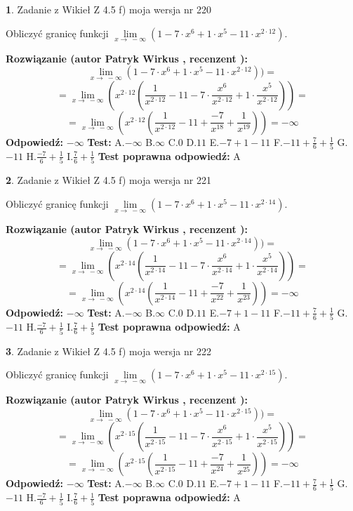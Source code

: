 \documentclass[12pt, a4paper]{article}
\theoremstyle{definition} %
\newtheorem{zad}{}
\newcommand{\zadStart}[1]{\begin{zad}#1\newline}
\newcommand{\zadStop}{\end{zad}}
\newcommand{\rozwStart}[2]{\noindent \textbf{Rozwiązanie (autor #1 , recenzent #2): }\newline}
\newcommand{\rozwStop}{\newline}
\newcommand{\odpStart}{\noindent \textbf{Odpowiedź:}\newline}
\newcommand{\odpStop}{\newline}
\newcommand{\testStart}{\noindent \textbf{Test:}\newline}
\newcommand{\testStop}{\newline}
\newcommand{\kluczStart}{\noindent \textbf{Test poprawna odpowiedź:}\newline}
\newcommand{\kluczStop}{\newline}
\begin{document}
\zadStart{Zadanie z Wikieł Z 4.5 f) moja wersja nr 220}



Obliczyć granicę funkcji  $\lim\limits_{x\to\ -\infty}(1 - 7 \cdot x^{6}+1 \cdot x^{5}- 11 \cdot x^{2\cdot12})$.
\zadStop
\rozwStart{Patryk Wirkus}{}
$$\lim\limits_{x\to\ -\infty}(1 - 7 \cdot x^{6}+1 \cdot x^{5}- 11 \cdot x^{2\cdot12}))=$$
$$=\lim\limits_{x\to\ -\infty}(x^{2\cdot12}(\frac{1}{x^{2\cdot12}}-11 -7 \cdot \frac{x^{6}}{x^{2\cdot12}}+1 \cdot \frac{x^{5}}{x^{2\cdot12}}))=$$
$$=\lim\limits_{x\to\ -\infty}(x^{2\cdot12}(\frac{1}{x^{2\cdot12}}-11 + \frac{-7}{x^{18}}+ \frac{1}{x^{19}}))=-\infty$$
\rozwStop
\odpStart
$-\infty$
\odpStop
\testStart
A.$-\infty$ B.$\infty$ C.$0$ D.$11$ E.$-7 + 1 - 11$
F.$-11+\frac{7}{6}+\frac{1}{5}$ G.$-11$
H.$\frac{-7}{6}+\frac{1}{5}$
I.$\frac{7}{6}+\frac{1}{5}$
\testStop
\kluczStart
A
\kluczStop



\zadStart{Zadanie z Wikieł Z 4.5 f) moja wersja nr 221}



Obliczyć granicę funkcji  $\lim\limits_{x\to\ -\infty}(1 - 7 \cdot x^{6}+1 \cdot x^{5}- 11 \cdot x^{2\cdot14})$.
\zadStop
\rozwStart{Patryk Wirkus}{}
$$\lim\limits_{x\to\ -\infty}(1 - 7 \cdot x^{6}+1 \cdot x^{5}- 11 \cdot x^{2\cdot14}))=$$
$$=\lim\limits_{x\to\ -\infty}(x^{2\cdot14}(\frac{1}{x^{2\cdot14}}-11 -7 \cdot \frac{x^{6}}{x^{2\cdot14}}+1 \cdot \frac{x^{5}}{x^{2\cdot14}}))=$$
$$=\lim\limits_{x\to\ -\infty}(x^{2\cdot14}(\frac{1}{x^{2\cdot14}}-11 + \frac{-7}{x^{22}}+ \frac{1}{x^{23}}))=-\infty$$
\rozwStop
\odpStart
$-\infty$
\odpStop
\testStart
A.$-\infty$ B.$\infty$ C.$0$ D.$11$ E.$-7 + 1 - 11$
F.$-11+\frac{7}{6}+\frac{1}{5}$ G.$-11$
H.$\frac{-7}{6}+\frac{1}{5}$
I.$\frac{7}{6}+\frac{1}{5}$
\testStop
\kluczStart
A
\kluczStop



\zadStart{Zadanie z Wikieł Z 4.5 f) moja wersja nr 222}



Obliczyć granicę funkcji  $\lim\limits_{x\to\ -\infty}(1 - 7 \cdot x^{6}+1 \cdot x^{5}- 11 \cdot x^{2\cdot15})$.
\zadStop
\rozwStart{Patryk Wirkus}{}
$$\lim\limits_{x\to\ -\infty}(1 - 7 \cdot x^{6}+1 \cdot x^{5}- 11 \cdot x^{2\cdot15}))=$$
$$=\lim\limits_{x\to\ -\infty}(x^{2\cdot15}(\frac{1}{x^{2\cdot15}}-11 -7 \cdot \frac{x^{6}}{x^{2\cdot15}}+1 \cdot \frac{x^{5}}{x^{2\cdot15}}))=$$
$$=\lim\limits_{x\to\ -\infty}(x^{2\cdot15}(\frac{1}{x^{2\cdot15}}-11 + \frac{-7}{x^{24}}+ \frac{1}{x^{25}}))=-\infty$$
\rozwStop
\odpStart
$-\infty$
\odpStop
\testStart
A.$-\infty$ B.$\infty$ C.$0$ D.$11$ E.$-7 + 1 - 11$
F.$-11+\frac{7}{6}+\frac{1}{5}$ G.$-11$
H.$\frac{-7}{6}+\frac{1}{5}$
I.$\frac{7}{6}+\frac{1}{5}$
\testStop
\kluczStart
A
\kluczStop
\end{document}
